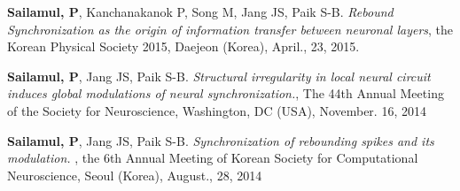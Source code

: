 \documentclass[master,english,final]{kaist-ucs}
\begin{document}

    \begin{activity}
     \item \textbf{Sailamul,  P},  Kanchanakanok P, Song M, Jang JS, Paik S-B. 
             \textit{Rebound Synchronization as the origin of information transfer between neuronal layers}, the Korean Physical Society 2015, Daejeon (Korea), April., 23, 2015.                
        \item  \textbf{Sailamul, P}, Jang JS, Paik S-B.          
        \textit{Structural irregularity in local neural circuit induces global modulations of neural synchronization.}, The 44th Annual Meeting of the Society for Neuroscience, Washington, DC (USA), November. 16, 2014 \\
        \item \textbf{Sailamul,  P}, Jang JS, Paik S-B.  
         \textit{Synchronization of rebounding spikes and its modulation. }, the 6th Annual Meeting of Korean Society for Computational Neuroscience, Seoul (Korea), August., 28, 2014 \\
    
    \end{activity}
\end{document}
